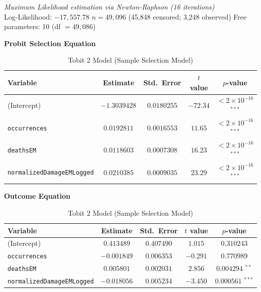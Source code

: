 \documentclass[12pt,letterpaper]{article}
\begin{document}
	
	\begin{table}[htbp]
		\centering
		\caption{Tobit 2 Model (Sample Selection Model)}
		\label{tab:tobit2}
		
		\vspace{0.3em}
		\begin{flushleft}
			\small
			\textit{Maximum Likelihood estimation via Newton-Raphson (16 iterations)} \\
			Log-Likelihood: $-17{,}557.78$ \quad
			$n = 49{,}096$ (45,848 censored; 3,248 observed) \quad
			Free parameters: 10 (df $= 49{,}086$)
		\end{flushleft}
		
		\vspace{0.5em}
		
		\textbf{Probit Selection Equation}
		
		\vspace{0.3em}
		\begin{tabular}{lcccc}
			\hline\hline
			Variable & Estimate & Std.\ Error & $t$ value & $p$-value \\
			\hline
			(Intercept)                   & $-1.3039428$ & $0.0180255$ & $-72.34$ & $< 2\times10^{-16}$ $^{***}$ \\
			\texttt{occurrences}          &  $0.0192811$ & $0.0016553$ &  $11.65$ & $< 2\times10^{-16}$ $^{***}$ \\
			\texttt{deathsEM}             &  $0.0118603$ & $0.0007308$ &  $16.23$ & $< 2\times10^{-16}$ $^{***}$ \\
			\texttt{normalizedDamageEMLogged} & $0.0210385$ & $0.0009035$ & $23.29$ & $< 2\times10^{-16}$ $^{***}$ \\
			\hline\hline
		\end{tabular}
		
		\vspace{1em}
		
		\textbf{Outcome Equation}
		
		\vspace{0.3em}
		\begin{tabular}{lcccc}
			\hline\hline
			Variable & Estimate & Std.\ Error & $t$ value & $p$-value \\
			\hline
			(Intercept)                   &  $0.413489$ & $0.407490$ &  $1.015$ & $0.310243$ \\
			\texttt{occurrences}          & $-0.001849$ & $0.006353$ & $-0.291$ & $0.770989$ \\
			\texttt{deathsEM}             &  $0.005801$ & $0.002031$ &  $2.856$ & $0.004294$ $^{**}$  \\
			\texttt{normalizedDamageEMLogged} & $-0.018056$ & $0.005234$ & $-3.450$ & $0.000561$ $^{***}$ \\
			\hline\hline
		\end{tabular}
		

\end{table}
\end{document}
